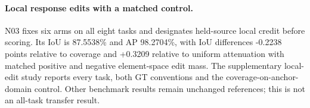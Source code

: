\paragraph{Local response edits with a matched control.}
N03 fixes six arms on all eight tasks and designates held-source local credit before scoring. Its IoU is 87.5538\% and AP 98.2704\%, with IoU differences -0.2238 points relative to coverage and +0.3209 relative to uniform attenuation with matched positive and negative element-space edit mass. The supplementary local-edit study reports every task, both GT conventions and the coverage-on-anchor-domain control. Other benchmark results remain unchanged references; this is not an all-task transfer result.
